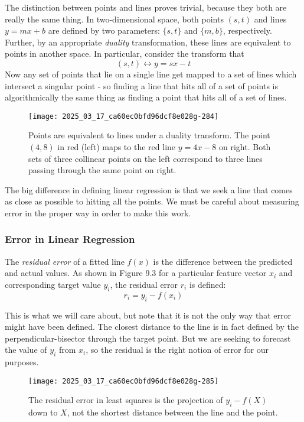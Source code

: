 \documentclass[10pt]{article}
\begin{document}
The distinction between points and lines proves trivial, because they both are really the same thing. In two-dimensional space, both points $(s, t)$ and lines $y=mx+b$ are defined by two parameters: $\{s, t\}$ and $\{m, b\}$, respectively. Further, by an appropriate \textit{duality} transformation, these lines are equivalent to points in another space. In particular, consider the transform that
\[ (s, t) \longleftrightarrow y=sx-t \]
Now any set of points that lie on a single line get mapped to a set of lines which intersect a singular point - so finding a line that hits all of a set of points is algorithmically the same thing as finding a point that hits all of a set of lines.

\begin{figure}[h]
\centering
\texttt{[image: 2025\_03\_17\_ca60ec0bfd96dcf8e028g-284]}
\caption{Points are equivalent to lines under a duality transform. The point $(4,8)$ in red (left) maps to the red line $y=4x-8$ on right. Both sets of three collinear points on the left correspond to three lines passing through the same point on right.}
\end{figure}

The big difference in defining linear regression is that we seek a line that comes as close as possible to hitting all the points. We must be careful about measuring error in the proper way in order to make this work.

\subsubsection{Error in Linear Regression}
The \textit{residual error} of a fitted line $f(x)$ is the difference between the predicted and actual values. As shown in Figure 9.3 for a particular feature vector $x_i$ and corresponding target value $y_i$, the residual error $r_i$ is defined:
\[ r_{i}=y_{i}-f\left(x_{i}\right) \]

This is what we will care about, but note that it is not the only way that error might have been defined. The closest distance to the line is in fact defined by the perpendicular-bisector through the target point. But we are seeking to forecast the value of $y_i$ from $x_i$, so the residual is the right notion of error for our purposes.

\begin{figure}[H]
\centering
\texttt{[image: 2025\_03\_17\_ca60ec0bfd96dcf8e028g-285]}
\caption{The residual error in least squares is the projection of $y_{i}-f(X)$ down to $X$, not the shortest distance between the line and the point.}
\end{figure}
\end{document}
